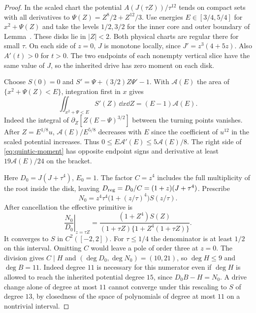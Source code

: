 \begin{proof}
In the scaled chart the potential $A(J(\tau Z))/\tau^{12}$ tends on compact sets with all derivatives to
$\Psi(Z)=Z^8/2+Z^{12}/3$. Use energies $E\in[3/4,5/4]$ for $x^2+\Psi(Z)$ and take the levels $1/2,3/2$ for the inner core and outer boundary of Lemma~. These disks lie in $|Z|<2$. Both physical charts are regular there for small $\tau$. On each side of $z=0$, $J$ is monotone locally, since $J'=z^3(4+5z)$. Also $A'(t)>0$ for $t>0$. The two endpoints of each nonempty vertical slice have the same value of $J$, so the inherited drive has zero moment on each disk.

Choose $S(0)=0$ and $S'=\Psi+(3/2)Z\Psi'-1$. With $\mathcal A(E)$ the area of $\{x^2+\Psi(Z)<E\}$, integration first in $x$ gives
\begin{equation}\label{eq:quintic-moment}
 \iint_{x^2+\Psi<E} S'(Z)\,\dd x\dd Z=(E-1)\mathcal A(E).
\end{equation}
Indeed the integral of $\partial_Z[Z(E-\Psi)^{3/2}]$ between the turning points vanishes. After $Z=E^{1/8}u$, $\mathcal A(E)/E^{5/8}$ decreases with $E$ since the coefficient of $u^{12}$ in the scaled potential increases. Thus $0\le E\mathcal A'(E)\le5\mathcal A(E)/8$. The right side of \eqref{eq:quintic-moment} has opposite endpoint signs and derivative at least $19\mathcal A(E)/24$ on the bracket.

Here $D_0=J(J+\tau^4)$, $E_0=1$. The factor $C=z^4$ includes the full multiplicity of the root inside the disk, leaving $D_{\rm reg}=D_0/C=(1+z)(J+\tau^4)$. Prescribe
\[
 N_0=z^4\tau^4\bigl(1+(z/\tau)^4\bigr)S(z/\tau).
\]
After cancellation the effective primitive is
\[
 \left.\frac{N_0}{D_0}\right|_{z=\tau Z}
 =\frac{(1+Z^4)S(Z)}{(1+\tau Z)\{1+Z^4(1+\tau Z)\}} .
\]
It converges to $S$ in $C^2([-2,2])$. For $\tau\le1/4$ the denominator is at least $1/2$ on this interval. Omitting $C$ would leave a pole of order three at $z=0$. The division gives $C\mid H$ and $(\deg D_0,\deg N_0)=(10,21)$, so $\deg H\le9$ and $\deg B=11$. Indeed degree $11$ is necessary for this numerator even if $\deg H$ is allowed to reach the inherited potential degree $15$, since $D_0B-H=N_0$. A drive change alone of degree at most $11$ cannot converge under this rescaling to $S$ of degree $13$, by closedness of the space of polynomials of degree at most $11$ on a nontrivial interval.


\end{proof}
